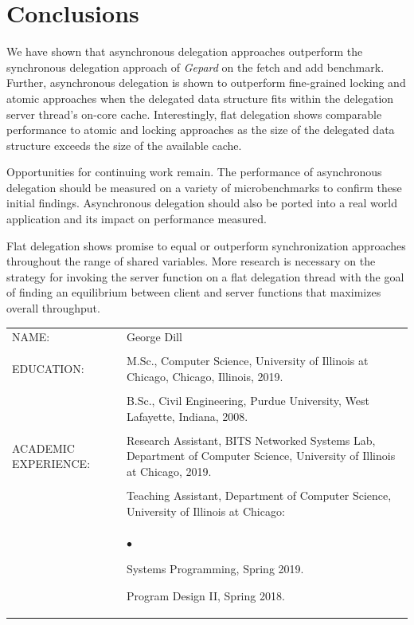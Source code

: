 \documentclass{uicthesi}
\newcommand{\squishlist}{
   \begin{list}{$\bullet$}
    { \setlength{\itemsep}{-.1ex}      \setlength{\parsep}{0ex}
      \setlength{\topsep}{0ex}       \setlength{\partopsep}{0ex}
      \setlength{\leftmargin}{.8em} \setlength{\labelwidth}{1em}
      \setlength{\labelsep}{0.5em} } }
\newcommand{\squishend}{\end{list}}
\begin{document}
\chapter{Conclusions}
We have shown that asynchronous delegation approaches outperform the synchronous delegation approach of \textit{Gepard} on the fetch and add benchmark. Further, asynchronous delegation is shown to outperform fine-grained locking and atomic approaches when the delegated data structure fits within the delegation server thread's on-core cache. Interestingly, flat delegation shows comparable performance to atomic and locking approaches as the size of the delegated data structure exceeds the size of the available cache. 

Opportunities for continuing work remain. The performance of asynchronous delegation should be measured on a variety of microbenchmarks to confirm these initial findings. Asynchronous delegation should also be ported into a real world application and its impact on performance measured. 

Flat delegation shows promise to equal or outperform synchronization approaches throughout the range of shared variables. More research is necessary on the strategy for invoking the server function on a flat delegation thread with the goal of finding an equilibrium between client and server functions that maximizes overall throughput. 


\bibformb

\newpage

\vita
    \pagestyle{pageontop}
   \thispagestyle{pageonbottom}
\begin{tabular}{p{2.8cm}p{10.5cm}}
NAME: & George Dill  \\ 
    &\\
EDUCATION:  &M.Sc., Computer Science, University of Illinois at Chicago, Chicago, Illinois, 2019. \\  
            &\\
            &B.Sc., Civil Engineering, Purdue University, West Lafayette, Indiana, 2008.  \\
            &\\
ACADEMIC EXPERIENCE:  &Research Assistant, BITS Networked Systems Lab, Department of Computer Science, University of Illinois at Chicago, 2019. \\
            &\\
            &Teaching Assistant, Department of Computer Science, University of Illinois at Chicago: \\
            &\squishlist            
            \item Systems Programming, Spring 2019.    
            \item Program Design II, Spring 2018.
            \squishend \\
            

 \end{tabular}
\end{document}
